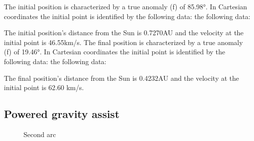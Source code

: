 \documentclass[11pt,a4paper]{report}
\begin{document}
The initial position is characterized by a true anomaly (f) of 85.98°. In Cartesian coordinates the initial point is identified by the following data:
the following data:

\begin{table}[H]
\centering
{}
\end{table}

The initial position’s distance from the Sun is 0.7270AU and the velocity at the initial point is 46.55km/s.
The final position is characterized by a true anomaly (f) of 19.46°. In Cartesian coordinates the initial point is identified by the following data:
the following data:

\begin{table}[H]
\centering
{}
\end{table}
The final position’s distance from the Sun is 0.4232AU and the velocity at the initial point is 62.60 km/s.

\subsection{Powered gravity assist}

\begin{figure}[H]
\centering
{}
    \caption{Second arc}
\end{figure}
\end{document}
